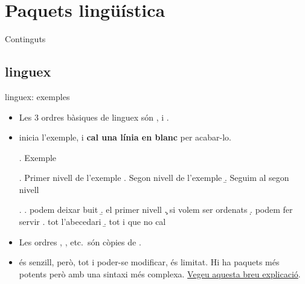 \section{Paquets lingüística}
\begin{frame}{Continguts}
\begin{multicols}{2}
\tableofcontents[currentsection]
\end{multicols}
\end{frame}


\subsection{linguex}
\begin{frame}[fragile]{linguex: exemples}
\begin{itemize}
\item Les 3 ordres bàsiques de linguex són ,  i .
\item {} inicia l'exemple, i \textbf{cal una línia en blanc} per acabar-lo.
\begin{exampletwouptiny2}
\ex. Exemple

\ex. Primer nivell de l'exemple
\a. Segon nivell de l'exemple
\b. Seguim al segon nivell

\ex.
\a. podem deixar buit
\b. el primer nivell
\c. si volem ser ordenats
\d. podem fer servir
\e. tot l'abecedari
\b. tot i que no cal

\end{exampletwouptiny2}
\item Les ordres , , etc.~són còpies de .
\item {} és senzill, però, tot i poder-se modificar, és limitat. Hi ha paquets més potents però amb una sintaxi més complexa. \href{https://www.jostellings.com/numbex.html}{Vegeu aquesta breu explicació}. 
\end{itemize}
\end{frame}

